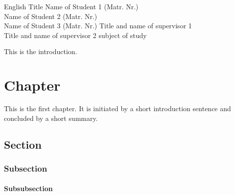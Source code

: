 \documentclass[xlevel, hyperref, nat, mp, en]{fgdh-thesis}
\begin{document}
\seminartitlepage
{English Title}
{Name of Student 1 (Matr. Nr.) \\ Name of Student 2 (Matr. Nr.) \\ Name of Student 3 (Matr. Nr.)}
{Title and name of supervisor 1 \\ Title and name of supervisor 2}
{subject of study}

\begin{preface}
  \abstract
  

  \tableofcontents
\end{preface}

\introduction

This is the introduction.


\section{Chapter}

This is the first chapter. It is initiated by a short introduction sentence and concluded by a short summary. 




\label{sec:chapter}



\subsection{Section}
\label{sec:section}

\cite{article}

\subsubsection{Subsection}
\label{sec:subsection}


\paragraph{Subsubsection}
\label{sec:subsubsection}
\end{document}
